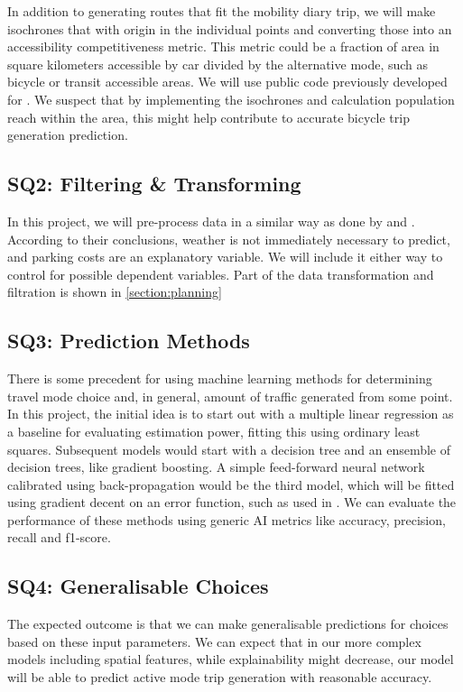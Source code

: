 \documentclass[sigconf, natbib=false, nonacm]{acmart}
\begin{document}
    In addition to generating routes that fit the mobility diary trip, we will make isochrones that with origin in the individual points and converting those into an accessibility competitiveness metric. This metric could be a fraction of area in square kilometers accessible by car divided by the alternative mode, such as bicycle or transit accessible areas. We will use public code previously developed for \textcite{de_geus_database_2023}. We suspect that by implementing the isochrones and calculation population reach within the area, this might help contribute to accurate bicycle trip generation prediction.  
    
    \subsection{SQ2: Filtering \& Transforming}
    In this project, we will pre-process data in a similar way as done by \textcite{bakri_inzichten_2023} and \textcite{zoutenbier_drukte_2021}. According to their conclusions, weather is not immediately necessary to predict, and parking costs are an explanatory variable. We will include it either way to control for possible dependent variables. Part of the data transformation and filtration is shown in \autoref{section:planning}
    
    \subsection{SQ3: Prediction Methods}\label{SQ3:predictionmethods}
    There is some precedent for using machine learning methods for determining travel mode choice and, in general, amount of traffic generated from some point. In this project, the initial idea is to start out with a multiple linear regression as a baseline for evaluating estimation power, fitting this using ordinary least squares. Subsequent models would start with a decision tree and an ensemble of decision trees, like gradient boosting. A simple feed-forward neural network calibrated using back-propagation would be the third model, which will be fitted using gradient decent on an error function, such as used in \cite{lee_comparison_2018}. We can evaluate the performance of these methods using generic AI metrics like accuracy, precision, recall and f1-score.

    \subsection{SQ4: Generalisable Choices}
    The expected outcome is that we can make generalisable predictions for choices based on these input parameters. We can expect that in our more complex models including spatial features, while explainability might decrease, our model will be able to predict active mode trip generation with reasonable accuracy. 
\end{document}
